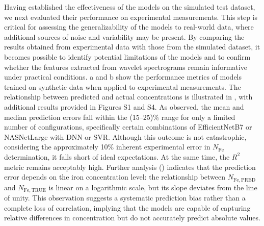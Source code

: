 \documentclass[10pt]{iopart}
\begin{document}
Having established the effectiveness of the models on the simulated test dataset,
we next evaluated their performance on experimental measurements.
This step is critical for assessing the generalizability of the models to real-world data,
where additional sources of noise and variability may be present.
By comparing the results obtained from experimental data with those from the simulated dataset,
it becomes possible to identify potential limitations of the models
and to confirm whether the features extracted from wavelet spectrograms remain informative under practical conditions.
a and b show the performance metrics of models trained on synthetic data when applied to experimental measurements.
The relationship between predicted and actual concentrations is illustrated in , with additional results provided in Figures S1 and S4.
As observed, the mean and median prediction errors fall within the (15–25)\% range for only a limited number of configurations,
specifically certain combinations of EfficientNetB7 or NASNetLarge with DNN or SVR.
Although this outcome is not catastrophic, considering the approximately 10\% inherent experimental error in $N_\mathrm{Fe}$ determination,
it falls short of ideal expectations.
At the same time, the $R^2$ metric remains acceptably high.
Further analysis () indicates that the prediction error depends on the iron concentration level:
the relationship between $N_\mathrm{Fe,PRED}$ and $N_\mathrm{Fe,TRUE}$ is linear on a logarithmic scale,
but its slope deviates from the line of unity.
This observation suggests a systematic prediction bias rather than a complete loss of correlation,
implying that the models are capable of capturing relative differences in concentration but do not accurately predict absolute values.
\end{document}
